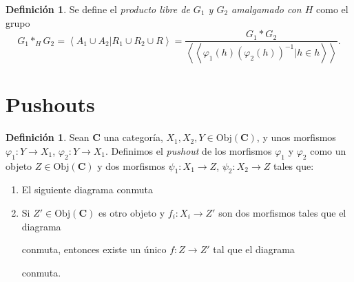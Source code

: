 \documentclass[12pt,a4paper]{book}
\theoremstyle{definition} \newtheorem{defn}[thm]{Definición}
\theoremstyle{definition} \newtheorem{ejemplo}[thm]{Ejemplo}
\theoremstyle{definition} \newtheorem{ejercicio}[thm]{Ejercicio}
\theoremstyle{remark} \newtheorem*{obs}{Observación}
\def\obj{\mathrm{Obj}}
\def\cat{\mathbf{C}}
\newcommand\gen[1]{\left\langle #1 \right\rangle}
\newcommand\ngen[1]{\left\langle\left\langle #1 \right\rangle \right\rangle}
\begin{document}
 \begin{defn}
  Se define el \emph{producto libre de $G_1$ y $G_2$ amalgamado con $H$} como el grupo
  \begin{equation*}
    G_1*_H G_2 = \gen{A_1\cup A_2 | R_1\cup R_2\cup R}= \frac{G_1*G_2}{\ngen{\varphi_1(h)(\varphi_2(h))^{-1}|h\in h}}.
  \end{equation*}
 \end{defn}

 \section{Pushouts}
 \begin{defn}
 Sean $\cat$ una categoría, $X_1,X_2,Y \in \obj(\cat)$, y unos morfismos $\varphi_1:Y\rightarrow X_1$, $\varphi_2:Y \rightarrow X_1$. Definimos el \emph{pushout} de los morfismos $\varphi_1$ y $\varphi_2$ como un objeto $Z\in \obj(\cat)$ y dos morfismos $\psi_1:X_1\rightarrow Z$, $\psi_2:X_2\rightarrow Z$ tales que:
\begin{enumerate}[label=(\alph*)]
  \item\label{conmuta} El siguiente diagrama conmuta
    \begin{center}
  \end{center}

\item\label{inicial}  Si $Z'\in \obj(\cat)$ es otro objeto y $f_i:X_i \rightarrow Z'$ son dos morfismos tales que el diagrama
    \begin{center}
  \end{center}
    conmuta, entonces existe un único $f:Z\rightarrow Z'$ tal que el diagrama
    \begin{center}
  \end{center}
    conmuta.
\end{enumerate}
\end{defn}
\end{document}
